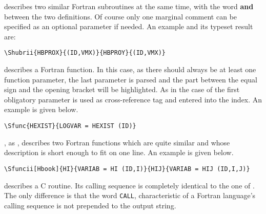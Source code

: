
 describes two similar Fortran subroutines
at the same time, with the word \textbf{and} between the two definitions. 
Of course only one marginal comment can be specified
as an optional parameter  if needed.
An example and its typeset result are:

\begin{verbatim}
\Shubrii{HBPROX}{(ID,VMX)}{HBPROY}{(ID,VMX)}
\end{verbatim}

 

 describes a Fortran function. 
In this case, as there should always be at least one function
parameter, the last parameter is parsed and the part between
the equal sign and the opening bracket will be highlighted.
As in the case of  the first obligatory parameter
is used as cross-reference tag and entered into the index. 
An example is given below.

\begin{verbatim}
\Sfunc{HEXIST}{LOGVAR = HEXIST (ID)}
\end{verbatim}



, as , describes two Fortran functions
which are quite similar and whose description is short enough
to fit on one line.
An example is given below.

\begin{verbatim}
\Sfuncii[Hbook]{HI}{VARIAB = HI (ID,I)}{HIJ}{VARIAB = HIJ (ID,I,J)}
\end{verbatim}



 describes a C routine. 
Its calling sequence is completely identical to the one of .
The only difference is that the word \texttt{CALL}, characteristic
of a Fortran language's calling sequence is not prepended to the
output string.


